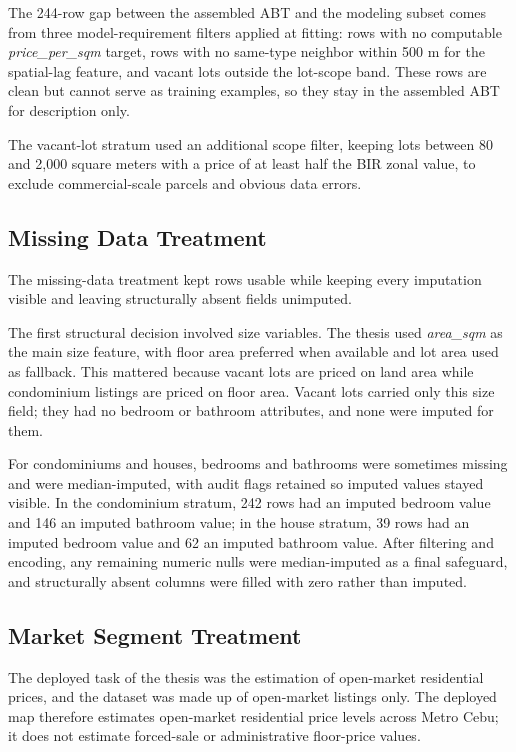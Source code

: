 The 244-row gap between the assembled ABT and the modeling subset comes from three model-requirement filters applied at fitting: rows with no computable \emph{price\_per\_sqm} target, rows with no same-type neighbor within 500 m for the spatial-lag feature, and vacant lots outside the lot-scope band. These rows are clean but cannot serve as training examples, so they stay in the assembled ABT for description only.

The vacant-lot stratum used an additional scope filter, keeping lots between 80 and 2{,}000 square meters with a price of at least half the BIR zonal value, to exclude commercial-scale parcels and obvious data errors.


\subsection{Missing Data Treatment}\label{missing-data-treatment}

The missing-data treatment kept rows usable while keeping every imputation visible and leaving structurally absent fields unimputed.

The first structural decision involved size variables. The thesis used \emph{area\_sqm} as the main size feature, with floor area preferred when available and lot area used as fallback. This mattered because vacant lots are priced on land area while condominium listings are priced on floor area. Vacant lots carried only this size field; they had no bedroom or bathroom attributes, and none were imputed for them.

For condominiums and houses, bedrooms and bathrooms were sometimes missing and were median-imputed, with audit flags retained so imputed values stayed visible. In the condominium stratum, 242 rows had an imputed bedroom value and 146 an imputed bathroom value; in the house stratum, 39 rows had an imputed bedroom value and 62 an imputed bathroom value. After filtering and encoding, any remaining numeric nulls were median-imputed as a final safeguard, and structurally absent columns were filled with zero rather than imputed.


\subsection{Market Segment Treatment}\label{market-segment-treatment}

The deployed task of the thesis was the estimation of open-market residential prices, and the dataset was made up of open-market listings only. The deployed map therefore estimates open-market residential price levels across Metro Cebu; it does not estimate forced-sale or administrative floor-price values.


